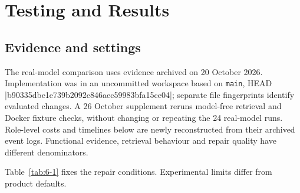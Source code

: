 \chapter{Testing and Results}\label{chap:6}

\section{Evidence and settings}\label{sec:6.1}

The real-model comparison uses evidence archived on 20 October 2026. Implementation was in an uncommitted workspace based on \texttt{main}, HEAD \code|b90335dbe1e739b2092c846aec59983bfa15ce04|; separate file fingerprints identify evaluated changes. A 26 October supplement reruns model-free retrieval and Docker fixture checks, without changing or repeating the 24 real-model runs. Role-level costs and timelines below are newly reconstructed from their archived event logs. Functional evidence, retrieval behaviour and repair quality have different denominators.

Table~\ref{tab:6-1} fixes the repair conditions. Experimental limits differ from product defaults.

